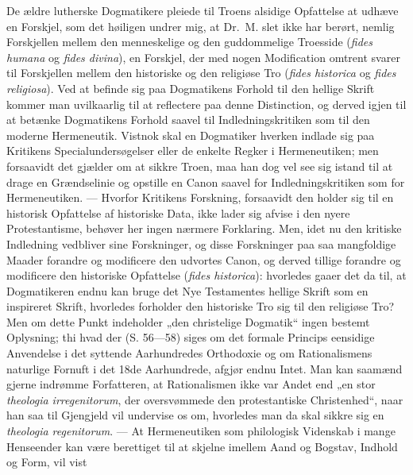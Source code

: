 De ældre lutherske Dogmatikere pleiede til Troens alsidige
Opfattelse at udhæve en Forskjel, som det høiligen undrer mig, at
Dr.\ M. slet ikke har berørt, nemlig
 Forskjellen mellem den menneskelige og den guddommelige Troesside
(\textit{fides humana} og \textit{fides divina}), en Forskjel, der
med nogen Modification omtrent svarer til Forskjellen mellem den
historiske og den religiøse Tro (\textit{fides historica} og
\textit{fides religiosa}). Ved at befinde sig paa Dogmatikens
Forhold til den hellige Skrift kommer man uvilkaarlig til at
reflectere paa denne Distinction, og derved igjen til at betænke
Dogmatikens Forhold saavel til Indledningskritiken som til den
moderne Hermeneutik. Vistnok skal en Dogmatiker hverken indlade
sig paa Kritikens Specialundersøgelser eller de enkelte Regker i
Hermeneutiken; men forsaavidt det gjælder om at sikkre Troen, maa
han dog vel see sig istand til at drage en Grændselinie og
opstille en Canon saavel for Indledningskritiken som for
Hermeneutiken. --- Hvorfor Kritikens Forskning, forsaavidt den
holder sig til en historisk Opfattelse af historiske Data, ikke
lader sig afvise i den nyere Protestantisme, behøver her ingen
nærmere Forklaring. Men, idet nu den kritiske Indledning
vedbliver sine Forskninger, og disse Forskninger paa saa
mangfoldige Maader forandre og modificere den udvortes Canon, og
derved tillige forandre og modificere den historiske Opfattelse
(\textit{fides historica}): hvorledes gaaer det da til, at
Dogmatikeren endnu kan bruge det Nye Testamentes hellige Skrift
som en inspireret Skrift, hvorledes forholder den historiske Tro
sig til den religiøse Tro? Men om dette Punkt indeholder „den
christelige Dogmatik“ ingen bestemt Oplysning; thi hvad der (S.
 56---58) siges om det formale Princips eensidige Anvendelse i det
syttende Aarhundredes Orthodoxie og om Rationalismens naturlige
Fornuft i det 18de Aarhundrede, afgjør endnu Intet. Man kan
saamænd gjerne indrømme Forfatteren, at Rationalismen ikke var
Andet end „en stor \textit{theologia irregenitorum}, der
oversvømmede den protestantiske Christenhed“, naar han saa til
Gjengjeld vil undervise os om, hvorledes man da skal sikkre sig en
\textit{theologia regenitorum}. --- At Hermeneutiken som
philologisk Videnskab i mange Henseender kan være berettiget til
at skjelne imellem Aand og Bogstav, Indhold og Form, vil vist
